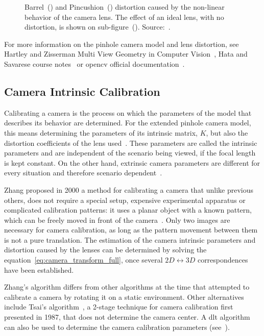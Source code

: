 \begin{figure}[ht!]
	\caption{Barrel~() and Pincushion~() distortion caused by the non-linear behavior of the camera lens. The effect of an ideal lens, with no distortion, is shown on sub-figure~(). Source:~\cite{camera_models}.}
	\label{fig:lense_distortion_types}
\end{figure}

For more information on the pinhole camera model and lens distortion, see Hartley and Zisserman Multi View Geometry in Computer Vision~\cite{mvg_book}, Hata and Savarese course notes~\cite{camera_models} or \acf{opencv} official documentation~\cite{opencv_doc}. 

\subsection{Camera Intrinsic Calibration}
\label{subsec:sota:camera-intrinisc-calibration}
Calibrating a camera is the process on which the parameters of the model that describes its behavior are determined. For the extended pinhole camera model, this means determining the parameters of its intrinsic matrix, $K$, but also the distortion coefficients of the lens used~\cite{mvg_book, camera_models, Bouguet2010, Heikkila1997}. These parameters are called the intrinsic parameters and are independent of the scenario being viewed, if the focal length is kept constant. On the other hand, extrinsic camera parameters are different for every situation and therefore scenario dependent~\cite{opencv_doc, Bouguet2010, Heikkila1997}.

Zhang proposed in 2000 a method for calibrating a camera that unlike previous others, does not require a special setup, expensive experimental apparatus or complicated calibration patterns: it uses a planar object with a known pattern, which can be freely moved in front of the camera~\cite{Zhang2000}. Only two images are necessary for camera calibration, as long as the pattern movement between them is not a pure translation. The estimation of the camera intrinsic parameters and distortion caused by the lenses can be determined by solving the equation~\ref{eq:camera_transform_full}, once several $2D \leftrightarrow 3D$ correspondences have been established.

Zhang's algorithm differs from other algorithms at the time that attempted to calibrate a camera by rotating it on a static environment. Other alternatives include Tsai's algorithm~\cite{Roger1987, mvg_book}, a 2-stage technique for camera calibration first presented in 1987, that does not determine the camera center. A \ac{dlt} algorithm can also be used to determine the camera calibration parameters (see~\cite{mvg_book}).

